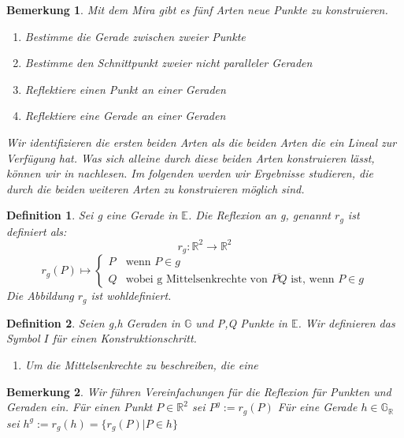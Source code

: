 \documentclass{scrbook}
\newtheorem{definition}{Definition}
\newtheorem{remark}{Bemerkung}
\begin{document}
\begin{remark}
    Mit dem Mira gibt es fünf Arten neue Punkte zu konstruieren.
    \begin{enumerate}
        \item Bestimme die Gerade zwischen zweier Punkte
        \item Bestimme den Schnittpunkt zweier nicht paralleler Geraden
        \item Reflektiere einen Punkt an einer Geraden
        \item Reflektiere eine Gerade an einer Geraden
    \end{enumerate}

    Wir identifizieren die ersten beiden Arten als die beiden Arten die ein Lineal zur Verfügung hat.
    Was sich alleine durch diese beiden Arten konstruieren lässt, können wir in \cite{Vogel} nachlesen.
    Im folgenden werden wir Ergebnisse studieren, die durch die beiden weiteren Arten zu konstruieren möglich sind. 
\end{remark}



\begin{definition}
    \label{Reflexion}
    Sei g eine Gerade in $\mathbb{E}$. Die Reflexion an g, genannt $r_g$ ist definiert als:
    $$r_g: \mathbb{R}^2 \longrightarrow \mathbb{R}^2$$
    $$r_g(P) \longmapsto \begin{cases}
    P & \text{wenn } P \in g \\
    Q & \text{wobei g Mittelsenkrechte von } \overline{PQ} \text{ ist, wenn } P \in g
    \end{cases}
    $$
    Die Abbildung $r_g$ ist wohldefiniert.
\end{definition}

\begin{definition}
    \label{def:Symbol}
    Seien g,h Geraden in $\mathbb{G}$ und P,Q Punkte in $\mathbb{E}$. Wir definieren das Symbol $I$ für einen Konstruktionschritt.
    \begin{enumerate}
        \item Um die Mittelsenkrechte zu beschreiben, die eine 
    \end{enumerate}
\end{definition}

\begin{remark}
    Wir führen Vereinfachungen für die Reflexion für Punkten und Geraden ein.
    Für einen Punkt $P \in \mathbb{R}^2$ sei $P^g := r_g(P)$
    Für eine Gerade $h \in \mathbb{G_R}$ sei $h^g := r_g(h) = \{r_g(P)|P \in h\}$
\end{remark}
\end{document}
